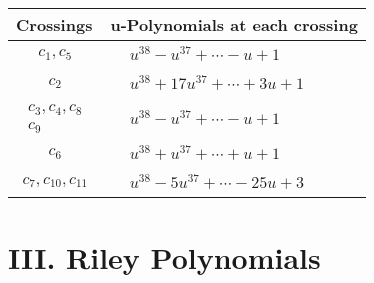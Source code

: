 \documentclass[1p]{elsarticle_modified}
\theoremstyle{definition}
\begin{document}
\begin{tabular}{m{50pt}|m{274pt}}
Crossings & \hspace{64pt}u-Polynomials at each crossing \\
\hline $$\begin{aligned}c_{1},c_{5}\end{aligned}$$&$\begin{aligned}
&u^{38}- u^{37}+\cdots- u+1
\end{aligned}$\\
\hline $$\begin{aligned}c_{2}\end{aligned}$$&$\begin{aligned}
&u^{38}+17 u^{37}+\cdots+3 u+1
\end{aligned}$\\
\hline $$\begin{aligned}c_{3},c_{4},c_{8}\\c_{9}\end{aligned}$$&$\begin{aligned}
&u^{38}- u^{37}+\cdots- u+1
\end{aligned}$\\
\hline $$\begin{aligned}c_{6}\end{aligned}$$&$\begin{aligned}
&u^{38}+u^{37}+\cdots+u+1
\end{aligned}$\\
\hline $$\begin{aligned}c_{7},c_{10},c_{11}\end{aligned}$$&$\begin{aligned}
&u^{38}-5 u^{37}+\cdots-25 u+3
\end{aligned}$\\
\hline
\end{tabular}\newpage\renewcommand{\arraystretch}{1}
\centering \section*{ III. Riley Polynomials}
\end{document}

